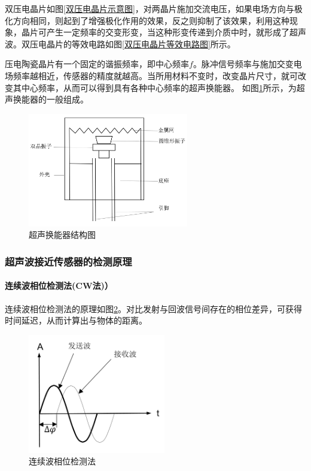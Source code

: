     双压电晶片如图\ref{双压电晶片示意图}，对两晶片施加交流电压，如果电场方向与极化方向相同，则起到了增强极化作用的效果，反之则抑制了该效果，利用这种现象，晶片可产生一定频率的交变形变，当这种形变传递到介质中时，就形成了超声波。双压电晶片的等效电路如图\ref{双压电晶片等效电路图}所示。\par

    压电陶瓷晶片有一个固定的谐振频率，即中心频率$f$。脉冲信号频率与施加交变电场频率越相近，传感器的精度就越高。当所用材料不变时，改变晶片尺寸，就可改变其中心频率，从而可以得到具有各种中心频率的超声换能器。
    如图\ref{超声换能器结构图}所示，为超声换能器的一般组成。
    \begin{figure}[!h]
    	\centering
    	\includegraphics[width=7cm]{figure/超声换能器结构图.png}
    	\caption{超声换能器结构图}
    	\label{超声换能器结构图}
    \end{figure}
\newpage
    \subsubsection{超声波接近传感器的检测原理}
    \paragraph{连续波相位检测法(CW法)）}
    连续波相位检测法的原理如图\ref{连续波相位检测法}。对比发射与回波信号间存在的相位差异，可获得时间延迟，从而计算出与物体的距离。\par
    \begin{figure}[!h]
    	\centering
    	\includegraphics[width=6cm]{figure/连续波相位检测法.png}
    	\caption{连续波相位检测法}
    	\label{连续波相位检测法}
    \end{figure}\par


